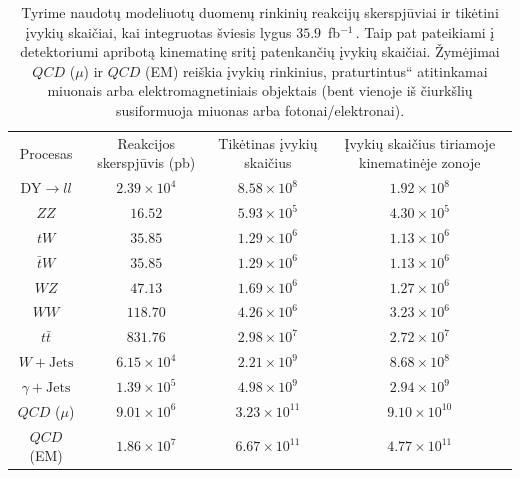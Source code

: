 \documentclass[a4paper, 12pt, oneside]{article}
\newcommand{\ZZ}{Z\! Z}
\newcommand{\WZ}{W\! Z}
\newcommand{\tbarW}{\bar{t}W}
\newcommand{\ttbar}{t\bar{t}}
\newcommand{\gJets}{\gamma\! +\!\mathrm{Jets}}
\newcommand{\WJets}{W\! +\!\mathrm{Jets}}
\newcommand{\ltq}[1]{{\quotedblbase{}#1\textquotedblleft{}}}
\newcommand{\invfb}{fb$^{-1}\,$}
\newcommand{\QCD}{QC\! D}
\newlength\q
\begin{document}
\begin{table}[t!]
	\begin{tabular}{|c|c|c|c|}
		\hline
		\multirow{2}{7em}{\centering Procesas} & \multirow{2}{8em}{\centering Reakcijos skerspjūvis (pb)} &
			\multirow{2}{8em}{\centering Tikėtinas įvykių skaičius} & \multirow{2}{11em}{\centering Įvykių skaičius tiriamoje kinematinėje zonoje} \\
		 & & & \\ 
		\hline\hline
		$\mathrm{DY} \!\!\rightarrow\! ll$ & $2.39\times 10^4$ & $8.58\times 10^8$ & $1.92\times 10^8$ \\ %
		\hline		
		$\ZZ$ & $16.52$ & $5.93\times 10^5$ & $4.30\times 10^5$ \\
		\hline
		$tW$ & $35.85$ & $1.29\times 10^6$ & $1.13\times 10^6$ \\
		\hline
		$\tbarW$ & $35.85$ & $1.29\times 10^6$ & $1.13\times 10^6$ \\
		\hline
		$\WZ$ & $47.13$ & $1.69\times 10^6$ & $1.27\times 10^6$ \\
		\hline
		$WW$ & $118.70$ & $4.26\times 10^6$ & $3.23\times 10^6$ \\
		\hline	
		$\ttbar$ & $831.76$ & $2.98\times 10^7$ & $2.72\times 10^7$ \\
		\hline	
		$\WJets$ & $6.15\times 10^4$ & $2.21\times 10^9$ & $8.68\times 10^8$\\ %
		\hline
		$\gJets$ & $1.39 \times 10^5$ & $4.98\times 10^9$ & $2.94\times 10^9$\\
		\hline
		$\QCD$ ($\mu$) & $9.01\times 10^6$ & $3.23\times 10^{11}$ & $9.10\times 10^{10}$ \\
		\hline
		$\QCD$ (EM) & $1.86\times 10^7$ & $6.67\times 10^{11}$ & $4.77\times 10^{11}$ \\
		\hline
	\end{tabular}
	\caption{\label{table:Xsec} Tyrime naudotų modeliuotų duomenų rinkinių reakcijų skerspjūviai ir tikėtini įvykių skaičiai, kai integruotas
	šviesis lygus $35.9$~\invfb. Taip pat pateikiami į detektoriumi apribotą kinematinę sritį patenkančių įvykių skaičiai.
	Žymėjimai $\QCD$ ($\mu$) ir $\QCD$ (EM) reiškia įvykių rinkinius, \ltq{praturtintus} atitinkamai miuonais arba elektromagnetiniais objektais
	(bent vienoje iš čiurkšlių susiformuoja miuonas arba fotonai/elektronai).}
\end{table}
\end{document}
